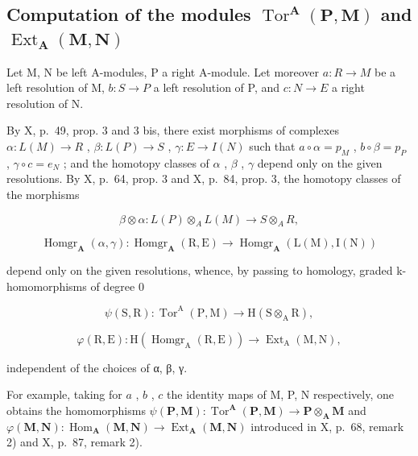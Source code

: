 \subsection{\texorpdfstring{Computation of the modules \(\operatorname{Tor}^{\mathbf{A}}(\mathbf{P},\mathbf{M})\) and \(\operatorname{Ext}_{\mathbf{A}}(\mathbf{M},\mathbf{N})\)}{Computation of the modules \textbackslash operatorname\{Tor\}\^{}\{\textbackslash mathbf\{A\}\}(\textbackslash mathbf\{P\},\textbackslash mathbf\{M\}) and \textbackslash operatorname\{Ext\}\_\{\textbackslash mathbf\{A\}\}(\textbackslash mathbf\{M\},\textbackslash mathbf\{N\})}}

Let M, N be left A-modules, P a right A-module. Let moreover \(a: R \rightarrow M\) be a left resolution of M, \(b: S \rightarrow P\) a left resolution of P, and \(c: N \rightarrow E\) a right resolution of N.

By X, p.~49, prop. 3 and 3 bis, there exist morphisms of complexes \(\alpha: L(M) \to R\) , \(\beta: L(P) \to S\) , \(\gamma: E \to I(N)\) such that \(a \circ \alpha = p_{M}\) , \(b \circ \beta = p_{P}\) , \(\gamma \circ c = e_{N}\) ; and the homotopy classes of \(\alpha\) , \(\beta\) , \(\gamma\) depend only on the given resolutions. By X, p.~64, prop. 3 and X, p.~84, prop. 3, the homotopy classes of the morphisms

\[
\beta \otimes \alpha : L (P) \otimes_ {A} L (M) \rightarrow S \otimes_ {A} R,
\]

\[
\operatorname{Homgr} _ {\mathbf {A}} (\alpha , \gamma): \operatorname{Homgr} _ {\mathbf {A}} (\mathrm{R}, \mathrm{E}) \rightarrow \operatorname{Homgr} _ {\mathbf {A}} (\mathrm{L} (\mathrm{M}), \mathrm{I} (\mathrm{N}))
\]

depend only on the given resolutions, whence, by passing to homology, graded k-homomorphisms of degree 0

\[
\psi (\mathrm{S}, \mathrm{R}): \operatorname{Tor} ^ {\mathrm{A}} (\mathrm{P}, \mathrm{M}) \rightarrow \mathrm{H} (\mathrm{S} \otimes_ {\mathrm{A}} \mathrm{R}),
\]

\[
\varphi (\mathrm{R}, \mathrm{E}): \mathrm{H} \left(\operatorname{Homgr} _ {\mathrm{A}} (\mathrm{R}, \mathrm{E})\right)\rightarrow \operatorname{Ext} _ {\mathrm{A}} (\mathrm{M}, \mathrm{N}),
\]

independent of the choices of α, β, γ.

For example, taking for \(a\) , \(b\) , \(c\) the identity maps of M, P, N respectively, one obtains the homomorphisms \(\psi(\mathbf{P}, \mathbf{M}) : \operatorname{Tor}^{\mathbf{A}}(\mathbf{P}, \mathbf{M}) \to \mathbf{P} \otimes_{\mathbf{A}} \mathbf{M}\) and \(\varphi(\mathbf{M}, \mathbf{N}) : \operatorname{Hom}_{\mathbf{A}}(\mathbf{M}, \mathbf{N}) \to \operatorname{Ext}_{\mathbf{A}}(\mathbf{M}, \mathbf{N})\) introduced in X, p.~68, remark 2) and X, p.~87, remark 2).

